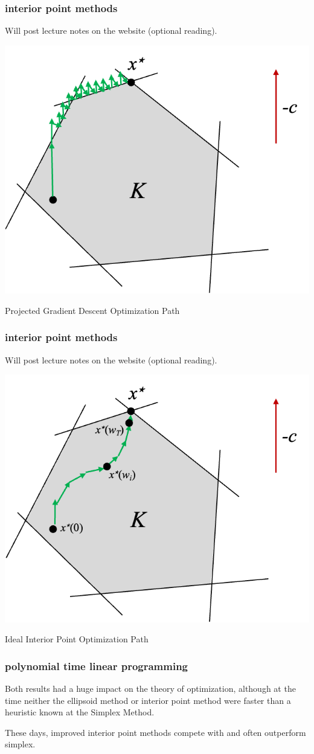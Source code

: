 \documentclass[compress]{beamer}
\begin{document}
\begin{frame}[t]
	\frametitle{interior point methods}
	Will post lecture notes on the website (optional reading).
	\begin{center}
			\includegraphics[width=.6\textwidth]{projected_gradient.png}
			
			Projected Gradient Descent Optimization Path
	\end{center}

\end{frame}

\begin{frame}[t]
	\frametitle{interior point methods}
	Will post lecture notes on the website (optional reading).
	\begin{center}
		\includegraphics[width=.6\textwidth]{interior_point.png}
		
		Ideal Interior Point Optimization Path
	\end{center}
	
\end{frame}

\begin{frame}[t]
	\frametitle{polynomial time linear programming}
	Both results had a huge impact on the theory of optimization, although at the time neither the ellipsoid method or interior point method were faster than a heuristic known at the Simplex Method. 
	
	These days, improved interior point methods compete with and often outperform simplex. 
	
\end{frame}
\end{document}
